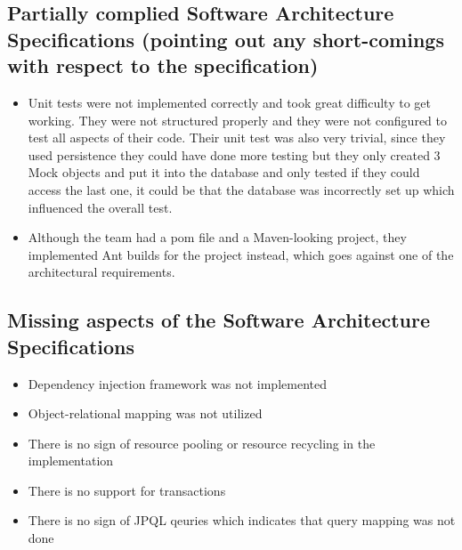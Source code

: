 \documentclass{article}
\begin{document}
	\subsection{Partially complied Software Architecture Specifications (pointing out any short-comings with respect to the specification)}

	\begin{itemize}

		\item Unit tests were not implemented correctly and took great difficulty to get working. They were not structured properly and they were not configured to test all aspects of their code. Their unit test was also very trivial, since they used persistence they could have done more testing but they only created 3 Mock objects and put it into the database and only tested if they could access the last one, it could be that the database was incorrectly set up which influenced the overall test.
		\item Although the team had a pom file and a Maven-looking project, they implemented Ant builds for the project instead, which goes against one of the architectural requirements.
		\item@TODO
	\end{itemize}

	\subsection{Missing aspects of the Software Architecture Specifications}
	\begin{itemize}
		\item Dependency injection framework was not implemented
		\item Object-relational mapping was not utilized
		\item There is no sign of resource pooling or resource recycling in the implementation
		\item There is no support for transactions
		\item There is no sign of JPQL qeuries which indicates that query mapping was not done
		\item@TODO
	\end{itemize}
	












\end{document}
